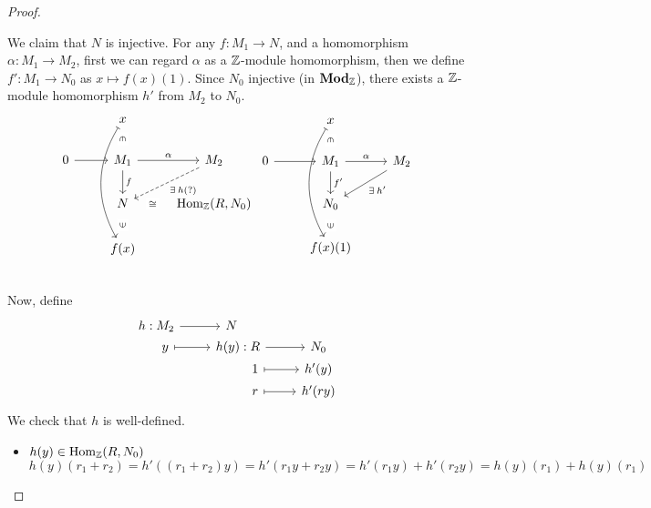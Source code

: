 \begin{theorem}
\begin{proof}
\begin{enumerate}[label={\bf Case \arabic*:}]
        We claim that $N$ is injective. For any $f : M_1 \to N$,
        and a homomorphism $\alpha : M_1 \to M_2$,
        first we can regard $\alpha$ as a $\mathbb{Z}$-module homomorphism, then
        we define $f' : M_1 \to N_0$ as $x \mapsto f(x)(1)$. Since
        $N_0$ injective (in $\mathbf{Mod}_{\mathbb{Z}}$), there exists a $\mathbb{Z}$-module
        homomorphism $h'$ from $M_2$ to $N_0$.
        \[
          \begin{tikzcd}[contains/.style = {draw=none, 
            "\in" description ,sloped}]
                        & x \ar[d, contains] \ar[ddd, mapsto, bend right] \\
              0 \ar[r]  & M_1 \ar[r,"\alpha"] \ar[d, "f"] & M_2 \ar[ld, 
              "\exists h (?)",dashed] \\
                        & N \ar[r, draw=none, "\cong" description]&  
                        \Hom_\Zb(R, N_0) \\
                        & f(x) \ar[u, contains] \\
            \end{tikzcd}
            \begin{tikzcd}[contains/.style = {draw=none, 
            "\in" description ,sloped}]
                        & x \ar[d, contains] \ar[ddd, mapsto, bend right] \\
              0 \ar[r]  & M_1 \ar[r,"\alpha"] \ar[d, "f'"] & M_2 \ar[ld, 
              "\exists h'"] \\
                        & N_0 \\
                        & f(x)(1) \ar[u, contains] \\
          \end{tikzcd}
        \]
        Now, define
        \[
        \begin{tikzcd}[row sep=0.1]
          h: &[-3em] M_2 \ar[r] & N \\
             &[-3em] y \ar[r, mapsto] & h(y) : &[-3em] R \ar[r] & N_0 \\
             &[-3em] & &[-3em] 1 \ar[r, mapsto] & h'(y) \\
             &[-3em] & &[-3em] r \ar[r, mapsto] & h'(ry) \\
        \end{tikzcd}
        \]
        We check that $h$ is well-defined.
        \begin{itemize}
          \item $h(y) \in \operatorname{Hom}_{\mathbb{Z}}(R, N_0)$
            \[
              h(y)(r_1 + r_2) = h'((r_1 + r_2)y) = h'(r_1 y + r_2 y)
              = h'(r_1y) + h'(r_2y) = h(y)(r_1) + h(y)(r_1)
\]
\end{itemize}
\end{enumerate}
\end{proof}
\end{theorem}
